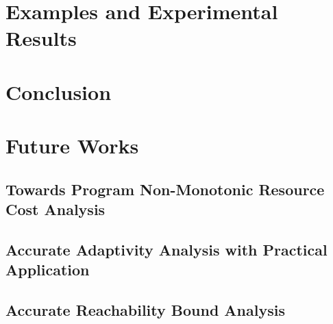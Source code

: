 \documentclass[12pt, letterpaper]{report}   %
\begin{document}
\chapter{Examples and Experimental Results}
\label{sec:reachability-example}



\chapter*{}



\chapter{Conclusion}
\label{sec:conclusion}

\clearpage
%
\chapter{Future Works}
\label{sec:future}
\section{Towards Program Non-Monotonic Resource Cost Analysis }
\label{sec:future-cost}


% 

\section{Accurate Adaptivity Analysis with Practical Application}

\section{Accurate Reachability Bound Analysis}
\end{document}

